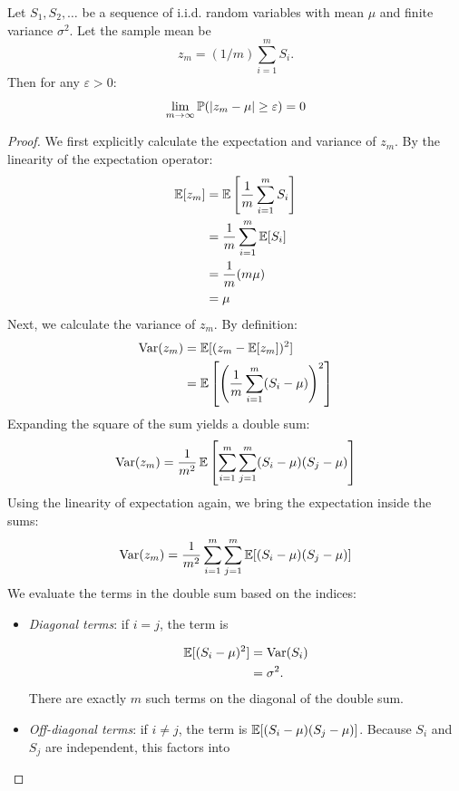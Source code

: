 \begin{theorem}
Let $S_1, S_2, \dots$ be a sequence of i.i.d. random variables with mean $\mu$ and finite variance $\sigma^2$. Let the sample mean be
\[
z_m = (1/m) \sum_{i=1}^m S_i.
\]
Then for any $\varepsilon > 0$:
\begin{equation}
\lim_{m \to \infty} \mathbb{P}(|z_m - \mu| \geq \varepsilon) = 0
\end{equation}

\end{theorem}

\begin{proof}
We first explicitly calculate the expectation and variance of $z_m$.
By the linearity of the expectation operator:
\begin{equation}
\begin{aligned}
\operatorname{\mathbb{E}}[z_m] &= \operatorname{\mathbb{E}}\left[ \frac{1}{m} \sum_{i=1}^m S_i \right] \\
&= \frac{1}{m} \sum_{i=1}^m \operatorname{\mathbb{E}}[S_i] \\
&= \frac{1}{m} (m \mu) \\
&= \mu
\end{aligned}
\end{equation}
Next, we calculate the variance of $z_m$. By definition:
\begin{equation}
\begin{aligned}
\operatorname{Var}(z_m) &= \operatorname{\mathbb{E}}[(z_m - \operatorname{\mathbb{E}}[z_m])^2] \\
&= \operatorname{\mathbb{E}}\left[ \left( \frac{1}{m} \sum_{i=1}^m (S_i - \mu) \right)^2 \right]
\end{aligned}
\end{equation}
Expanding the square of the sum yields a double sum:
\begin{equation}
\operatorname{Var}(z_m) = \frac{1}{m^2} \operatorname{\mathbb{E}}\left[ \sum_{i=1}^m \sum_{j=1}^m (S_i - \mu)(S_j - \mu) \right]
\end{equation}
Using the linearity of expectation again, we bring the expectation inside the sums:
\begin{equation}
\operatorname{Var}(z_m) = \frac{1}{m^2} \sum_{i=1}^m \sum_{j=1}^m \operatorname{\mathbb{E}}[(S_i - \mu)(S_j - \mu)]
\end{equation}
We evaluate the terms in the double sum based on the indices:
\begin{itemize}
\item \textit{Diagonal terms}: if $i = j$, the term is

\[
\begin{aligned}
\operatorname{\mathbb{E}}[(S_i - \mu)^2] &= \operatorname{Var}(S_i) \\
&= \sigma^2.
\end{aligned}
\]
There are exactly $m$ such terms on the diagonal of the double sum.
\item \textit{Off-diagonal terms}: if $i \neq j$, the term is $\operatorname{\mathbb{E}}[(S_i - \mu)(S_j - \mu)]$. Because $S_i$ and $S_j$ are independent, this factors into


\end{itemize}
\end{proof}
